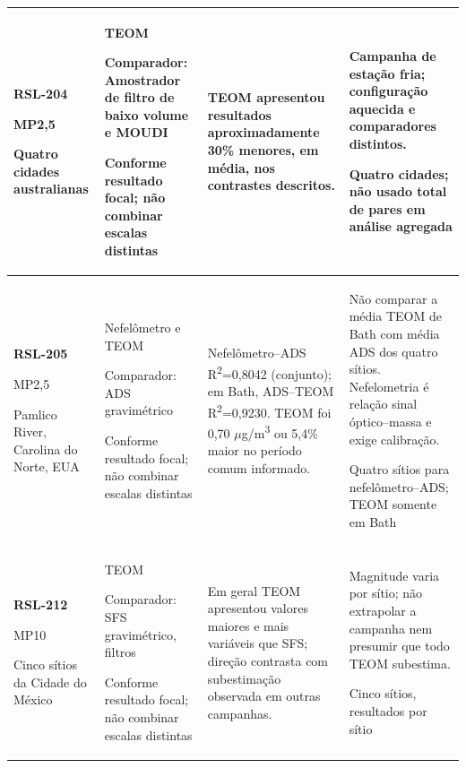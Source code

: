 \begin{longtable}{|P{0.18\textwidth}|P{0.25\textwidth}|P{0.28\textwidth}|P{\arrayrulewidth\relax}|}
\textbf{RSL-204}\par\textcite{rsl204}\par MP2,5\par Quatro cidades australianas & TEOM\par\medskip Comparador: Amostrador de filtro de baixo volume e MOUDI\par\medskip Conforme resultado focal; não combinar escalas distintas & TEOM apresentou resultados aproximadamente 30\% menores, em média, nos contrastes descritos. & Campanha de estação fria; configuração aquecida e comparadores distintos.\par\medskip Quatro cidades; não usado total de pares em análise agregada\\\hline
\textbf{RSL-205}\par\textcite{rsl205}\par MP2,5\par Pamlico River, Carolina do Norte, EUA & Nefelômetro e TEOM\par\medskip Comparador: ADS gravimétrico\par\medskip Conforme resultado focal; não combinar escalas distintas & Nefelômetro--ADS R\textsuperscript{2}=0,8042 (conjunto); em Bath, ADS--TEOM R\textsuperscript{2}=0,9230. TEOM foi 0,70 \ensuremath{\mu}g/m\textsuperscript{3} ou 5,4\% maior no período comum informado. & Não comparar a média TEOM de Bath com média ADS dos quatro sítios. Nefelometria é relação sinal óptico--massa e exige calibração.\par\medskip Quatro sítios para nefelômetro--ADS; TEOM somente em Bath\\\hline
\textbf{RSL-212}\par\textcite{rsl212}\par MP10\par Cinco sítios da Cidade do México & TEOM\par\medskip Comparador: SFS gravimétrico, filtros\par\medskip Conforme resultado focal; não combinar escalas distintas & Em geral TEOM apresentou valores maiores e mais variáveis que SFS; direção contrasta com subestimação observada em outras campanhas. & Magnitude varia por sítio; não extrapolar a campanha nem presumir que todo TEOM subestima.\par\medskip Cinco sítios, resultados por sítio\\\hline

\end{longtable}

